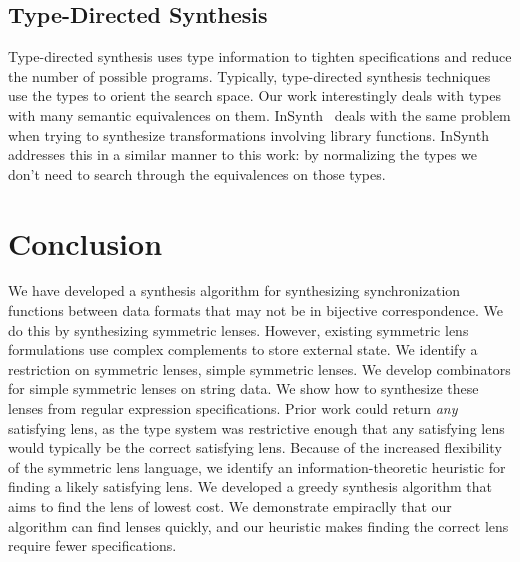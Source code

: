 \documentclass[acmsmall,screen,anonymous]{acmart}
\begin{document}
\subsection{Type-Directed Synthesis}

Type-directed synthesis uses type information to tighten specifications and
reduce the number of possible programs. Typically, type-directed synthesis
techniques use the types to orient the search space.  Our work interestingly
deals with types with many semantic equivalences on them. InSynth~\cite{?}
deals with the same problem when trying to synthesize transformations involving
library functions. InSynth addresses this in a similar manner to this work: by
normalizing the types we don't need to search through the equivalences on those
types.


\section{Conclusion}
\label{sec:conc}
We have developed a synthesis algorithm for synthesizing synchronization
functions between data formats that may not be in bijective correspondence. We
do this by synthesizing symmetric lenses. However, existing symmetric lens
formulations use complex complements to store external state. We identify a
restriction on symmetric lenses, simple symmetric lenses. We develop combinators
for simple symmetric lenses on string data. We show how to synthesize these
lenses from regular expression specifications. Prior work could return
\emph{any} satisfying lens, as the type system was restrictive enough that any
satisfying lens would typically be the correct satisfying lens. Because of the
increased flexibility of the symmetric lens language, we identify an
information-theoretic heuristic for finding a likely satisfying lens. We
developed a greedy synthesis algorithm that aims to find the lens of lowest
cost. We demonstrate empiraclly that our algorithm can find lenses quickly, and
our heuristic makes finding the correct lens require fewer specifications.


\begin{acks}
\end{acks}

\ifanon\else
\fi

\end{document}
